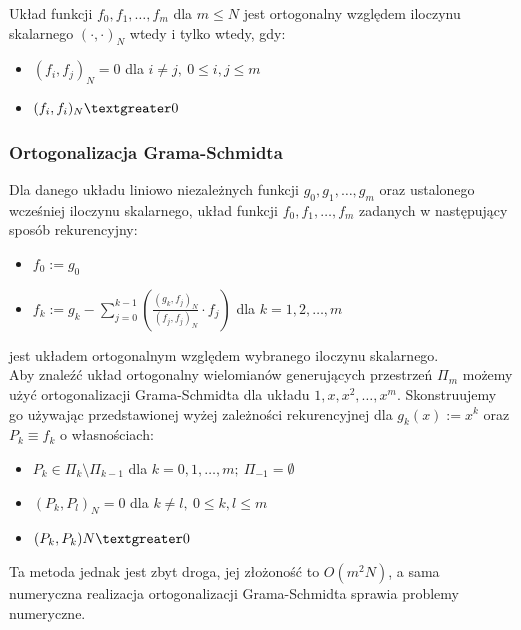 \documentclass[a4paper,11pt]{article}
\begin{document}
\noindent Układ funkcji $f_0, f_1, \ldots, f_m$ dla $m \leq N$ jest ortogonalny względem iloczynu skalarnego $(\cdot, \cdot)_N$ wtedy i tylko wtedy, gdy:
\begin{itemize}
\item $(f_i, f_j)_N = 0$ dla $i \neq j, \ 0 \leq i, j \leq m$
\item $(f_i, f_i)_N \textgreater 0$
\end{itemize}

\subsubsection{Ortogonalizacja Grama-Schmidta}
Dla danego układu liniowo niezależnych funkcji $g_0, g_1, \ldots, g_m$ oraz ustalonego wcześniej iloczynu skalarnego, układ funkcji $f_0, f_1, \ldots, f_m$ zadanych w następujący sposób rekurencyjny:
\begin{itemize}
\item $f_0 := g_0$
\item $f_k := g_k - \sum\limits_{j=0}^{k-1} \left( \frac{(g_k, f_j)_N}{(f_j, f_j)_N} \cdot f_j  \right) $ dla $k=1,2,\ldots, m$
\end{itemize}

\noindent jest układem ortogonalnym względem wybranego iloczynu skalarnego. \\
Aby znaleźć układ ortogonalny wielomianów generujących przestrzeń $\Pi_m$ możemy użyć ortogonalizacji Grama-Schmidta dla układu $1, x, x^2, \ldots, x^m$. Skonstruujemy go używając przedstawionej wyżej zależności rekurencyjnej dla $g_k(x) := x^k$ oraz $P_k \equiv f_k$ o własnościach:
\begin{itemize}
\item $P_k \in \Pi_k \setminus \Pi_{k-1}$ dla $k=0,1,\ldots, m; \ \Pi_{-1} = \emptyset$
\item $(P_k, P_l)_N = 0$ dla $k \neq l, \ 0 \leq k, l \leq m$
\item $(P_k, P_k)N \textgreater 0$
\end{itemize}

\noindent Ta metoda jednak jest zbyt droga, jej złożoność to $O(m^2N)$, a sama numeryczna realizacja ortogonalizacji Grama-Schmidta sprawia problemy numeryczne.
\end{document}
